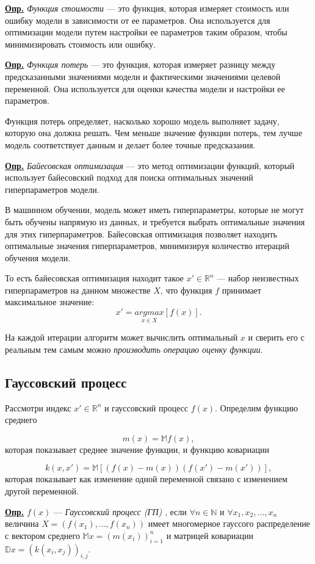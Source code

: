 \documentclass[a4paper,14pt]{extarticle}
\begin{document}
		\textbf{\underline{Опр.}} \textit{Функция стоимости}  --- это функция, которая измеряет стоимость или ошибку модели в зависимости от ее параметров. Она используется для оптимизации модели путем настройки ее параметров таким образом, чтобы минимизировать стоимость или ошибку.
		
		
		\textbf{\underline{Опр.}} \textit{Функция потерь} --- это функция, которая измеряет разницу между предсказанными значениями модели и фактическими значениями целевой переменной. Она используется для оценки качества модели и настройки ее параметров.
		
		Функция потерь определяет, насколько хорошо модель выполняет задачу, которую она должна решать. Чем меньше значение функции потерь, тем лучше модель соответствует данным и делает более точные предсказания.
		
		\textbf{\underline{Опр.}} \textit{Байесовская оптимизация} --- это метод оптимизации функций, который использует байесовский подход для поиска оптимальных значений гиперпараметров модели.
		
		В машинном обучении, модель может иметь гиперпараметры, которые не могут быть обучены напрямую из данных, и требуется выбрать оптимальные значения для этих гиперпараметров. Байесовская оптимизация позволяет находить оптимальные значения гиперпараметров, минимизируя количество итераций обучения модели.
		
		
		То есть байесовская оптимизация находит такое $x' \in \mathbb{R}^n$ --- набор неизвестных гиперпараметров на данном множестве $X$, что функция $f$ принимает максимальное значение: 
		$$ x' = \underset{x \in X}{argmax}[f(x)]. $$

		На каждой итерации алгоритм может вычислить оптимальный $x$ и сверить его с реальным тем самым можно \textit{производить операцию оценку функции}. 
		
		\subsection{Гауссовский процесс}
		Рассмотри индекс $x' \in \mathbb{R}^n$ и гауссовский процесс $f(x)$. Определим функцию среднего
		
		$$ m(x) = \mathbb{M} f(x),$$
		которая показывает среднее значение функции, и функцию ковариации
		
		$$ k(x, x') =  \mathbb{M}[(f(x)-m(x))(f(x')-m(x'))],$$
		которая показывает как изменение одной переменной связано с изменением другой переменной.
		
		\textbf{\underline{Опр.}}  $f(x)$ --- \textit{Гауссовский процесс (ГП)} , если $\forall n \in \mathbb{N}$ и $\forall x_1, x_2, \ldots, x_n$ величина $X = (f(x_1), \ldots, f(x_n))$ имеет многомерное гауссого распределение с вектором среднего $\mathbb{M} x = (m(x_i))_{i=1}^n$ и матрицей ковариации $\mathbb{D}x=(k(x_i, x_j))_{i, j}$. 
		
\end{document}
